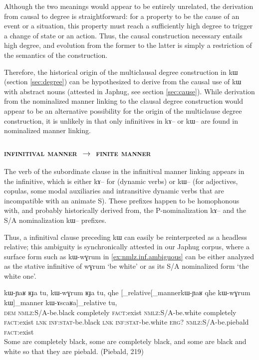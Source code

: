\documentclass[oldfontcommands,oneside,a4paper,11pt]{article}
\newcommand{\ipa}[1]{{\phon #1}} %
\begin{document}
Although the two meanings would appear to be entirely unrelated, the derivation from causal to degree is straightforward: for a property to be the cause of an event or a situation, this property must reach a sufficiently high degree to trigger a change of state or an action. Thus,  the causal construction necessary entails high degree, and evolution from the former to the latter is simply a restriction of the semantics of the construction.

Therefore, the historical origin of the multiclausal   degree construction in \ipa{kɯ}   (section \ref{sec:degree})   can be hypothesized to derive  from  the causal use of \ipa{kɯ}   with abstract nouns (attested in Japhug, see section \ref{sec:cause}). While derivation from the nominalized manner linking to the clausal degree construction would appear to be an alternative possibility for the origin of the multiclause degree construction, it is unlikely in that only infinitives in \ipa{kɤ--} or \ipa{kɯ--} are found in nominalized manner linking.  

 
  \subsubsection{\textsc{infinitival manner} $\rightarrow$ \textsc{finite manner}}

The verb of the subordinate clause in the infinitival manner linking appears in the infinitive, which is either \ipa{kɤ--} for (dynamic verbs) or \ipa{kɯ--} (for adjectives, copulas, some modal auxiliaries and intransitive dynamic verbs that are incompatible with an animate S). These prefixes happen to be homophonous with, and probably historically derived from, the P-nominalization \ipa{kɤ--} and the S/A nominalization \ipa{kɯ--} prefixes.

Thus, a infinitival clause preceding \ipa{kɯ} can easily be reinterpreted as a headless relative; this ambiguity is synchronically attested in our Japhug corpus, where a surface form such as \ipa{kɯ-wɣrum} in \ref{ex:nmlz.inf.ambiguous} can be either analyzed as the stative infinitive of \ipa{wɣrum} `be white' or as its S/A nominalized form `the white one'.
 
 \begin{exe}
\ex \label{ex:nmlz.inf.ambiguous}
\gll \ipa{nɯnɯ}  	\ipa{kɯ-ɲaʁ}  	\ipa{ʁɟa}  	\ipa{tu,}  	\ipa{kɯ-wɣrum}  	\ipa{ʁɟa}  	\ipa{tu,}   \ipa{qhe}  	[_{relative}[_{manner}\ipa{kɯ-ɲaʁ}  	\ipa{qhe}  	\ipa{kɯ-wɣrum}  	\ipa{kɯ}]_{manner}   	\ipa{kɯ-ɤscaʁa}]_{relative}  	\ipa{tu,}  \\
\textsc{dem} \textsc{nmlz}:S/A-be.black completely \textsc{fact}:exist
\textsc{nmlz}:S/A-be.white completely \textsc{fact}:exist
\textsc{lnk}   \textsc{inf:stat}-be.black \textsc{lnk} \textsc{inf:stat}-be.white \textsc{erg?} \textsc{nmlz}:S/A-be.piebald  \textsc{fact}:exist \\
\glt Some are completely black, some are completely black, and some are black and white so that they are piebald. (Piebald,  219)
\end{exe}
\end{document}

